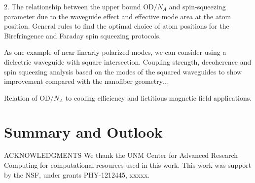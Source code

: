 \documentclass[preprint,aps,pra,onecolumn,superscriptaddress]{revtex4-1} %
\begin{document}
2. The relationship between the upper bound OD$ /N_A $ and spin-squeezing parameter due to the waveguide effect and effective mode area at the atom position. 
General rules to find the optimal choice of atom positions for the Birefringence and Faraday spin squeezing protocols.


As one example of near-linearly polarized modes, we can consider using a dielectric waveguide with square intersection. 
Coupling strength, decoherence and spin squeezing analysis based on the modes of the squared waveguides to show improvement compared with the nanofiber geometry...

Relation of OD$ /N_A $ to cooling efficiency and fictitious magnetic field applications.

\section{Summary and Outlook} \label{Sec::Conclusion}


ACKNOWLEDGMENTS
We thank the UNM Center for Advanced Research Computing for computational resources used in this work.
This work was support by the NSF, under grants PHY-1212445, xxxxx.

\end{document}
